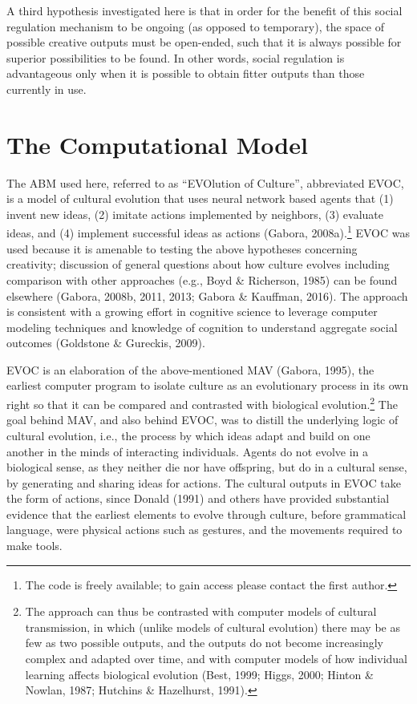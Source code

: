 \documentclass[a4paper,12pt,man,british]{apa6}
\begin{document}
A third hypothesis investigated here is that in order for the benefit of this social regulation mechanism to be ongoing (as opposed to temporary), the space of possible creative outputs must be open-ended, such that it is always possible for superior possibilities to be found. In other words, social regulation is advantageous only when it is possible to obtain fitter outputs than those currently in use. 

\section{The Computational Model}
The ABM used here, referred to as ``EVOlution of Culture'', abbreviated EVOC, is a model of cultural evolution that uses neural network based agents that (1) invent new ideas, (2) imitate actions implemented by neighbors, (3) evaluate ideas, and (4) implement successful ideas as actions (Gabora, 2008a).\footnote{The code is freely available; to gain access please contact the first author.} EVOC was used because it is amenable to testing the above hypotheses concerning creativity; discussion of general questions about how culture evolves including comparison with other approaches (e.g., Boyd \& Richerson, 1985) can be found elsewhere (Gabora, 2008b, 2011, 2013; Gabora \& Kauffman, 2016). The approach is consistent with a growing effort in cognitive science to leverage computer modeling techniques and knowledge of cognition to understand aggregate social outcomes (Goldstone \& Gureckis, 2009). 

EVOC is an elaboration of the above-mentioned MAV (Gabora, 1995), the earliest computer program to isolate culture as an evolutionary process in its own right so that it can be compared and contrasted with biological evolution.\footnote{The approach can thus be contrasted with computer models of cultural transmission, in which (unlike models of cultural evolution) there may be as few as two possible outputs, and the outputs do not become increasingly complex and adapted over time, and with computer models of how individual learning affects biological evolution (Best, 1999; Higgs, 2000; Hinton \& Nowlan, 1987; Hutchins \& Hazelhurst, 1991).} The goal behind MAV, and also behind EVOC, was to distill the underlying logic of cultural evolution, i.e., the process by which ideas adapt and build on one another in the minds of interacting individuals. Agents do not evolve in a biological sense, as they neither die nor have offspring, but do in a cultural sense, by generating and sharing ideas for actions. The cultural outputs in EVOC take the form of actions, since Donald (1991) and others have provided substantial evidence that the earliest elements to evolve through culture, before grammatical language, were physical actions such as gestures, and the movements required to make tools. 
\end{document}
